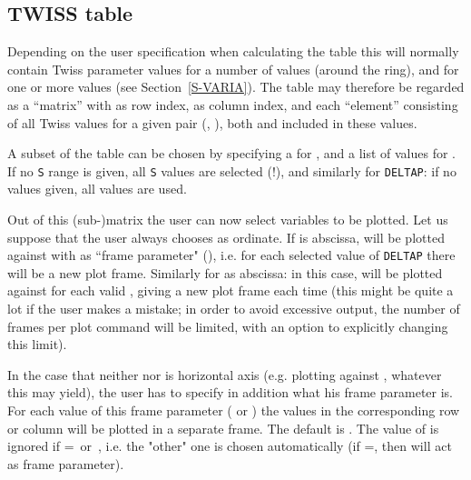 \subsection{TWISS table}
Depending on the user specification when calculating the table this will
normally contain Twiss parameter values for a number of  values
(around the ring), and for one or more  values
(see  Section~\ref{S-VARIA}).
The table may therefore be regarded as a ``matrix''
with  as row index,  as column index,
and each ``element'' consisting of all Twiss values for a given pair
(, ),
both  and  included in these values.
 
A subset of the table can be chosen by specifying a 
for ,
and a list of values for .
If no {\tt S} range is given, all {\tt S} values are selected (!),
and similarly for {\tt DELTAP}: if no values given, all values are used.
 
Out of this (sub-)matrix the user can now select variables to be
plotted.
Let us suppose that the user always chooses  as ordinate.
If  is abscissa,
 will be plotted against  with
 as ``frame parameter" (),
i.e. for each selected value of {\tt DELTAP} there will be a new plot
frame.
Similarly for  as abscissa: in this case,
 will be plotted against  for each valid
,
giving a new plot frame each time
(this might be quite a lot if the user makes a mistake;
in order to avoid excessive output,
the number of frames per plot command will be limited,
with an option  to explicitly changing this limit).
 
In the case that neither  nor  is horizontal axis
(e.g. plotting  against , whatever this may yield),
the user has to specify in addition what his frame parameter is.
For each value of this frame parameter ( or )
the values in the corresponding row or column will be plotted
in a separate frame.
The default is .
The value of  is ignored if
=~or~, i.e. the "other" one is chosen
automatically (if =, then  will act
as frame parameter).
 
